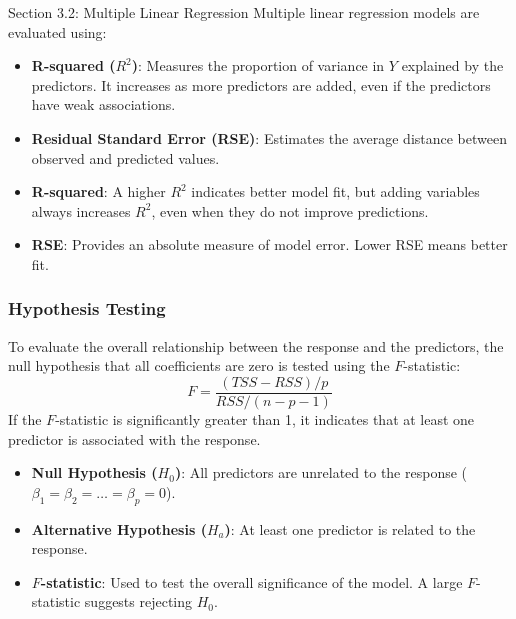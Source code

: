 \begin{notes}{Section 3.2: Multiple Linear Regression}
    Multiple linear regression models are evaluated using:
    \begin{itemize}
        \item \textbf{R-squared ($R^2$)}: Measures the proportion of variance in $Y$ explained by the predictors. It increases as more predictors are added, even if the predictors have weak associations.
        \item \textbf{Residual Standard Error (RSE)}: Estimates the average distance between observed and predicted values.
    \end{itemize}
    
    \begin{highlight}
        \begin{itemize}
            \item \textbf{R-squared}: A higher $R^2$ indicates better model fit, but adding variables always increases $R^2$, even when they do not improve predictions.
            \item \textbf{RSE}: Provides an absolute measure of model error. Lower RSE means better fit.
        \end{itemize}
    \end{highlight}
    
    \subsubsection*{Hypothesis Testing}
    
    To evaluate the overall relationship between the response and the predictors, the null hypothesis that all coefficients are zero is tested using the $F$-statistic:
    \[
    F = \frac{(TSS - RSS)/p}{RSS/(n - p - 1)}
    \]
    If the $F$-statistic is significantly greater than 1, it indicates that at least one predictor is associated with the response.
    
    \begin{highlight}
        \begin{itemize}
            \item \textbf{Null Hypothesis ($H_0$)}: All predictors are unrelated to the response ($\beta_1 = \beta_2 = \dots = \beta_p = 0$).
            \item \textbf{Alternative Hypothesis ($H_a$)}: At least one predictor is related to the response.
            \item \textbf{$F$-statistic}: Used to test the overall significance of the model. A large $F$-statistic suggests rejecting $H_0$.
        \end{itemize}
    \end{highlight}
    

\end{notes}
